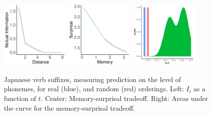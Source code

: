 \documentclass[11pt,letterpaper]{article}
\begin{document}
\begin{figure}
\begin{center}
		\includegraphics[width=0.3\textwidth]{figures/Japanese-suffixes-byPhonemes-it-heldout.pdf}
		\includegraphics[width=0.3\textwidth]{figures/Japanese-suffixes-byPhonemes-memsurp-heldout.pdf}
		\includegraphics[width=0.3\textwidth]{figures/Japanese-suffixes-byPhonemes-auc-hist-heldout.pdf}
\end{center}
	\caption{Japanese verb suffixes, measuring prediction on the level of phonemes, for real (blue), and random (red) orderings. Left: $I_t$ as a function of $t$. Center: Memory-surprisal tradeoff. Right: Areas under the curve for the memory-surprisal tradeoff.}\label{fig:jap-phon}
\end{figure}
\end{document}
